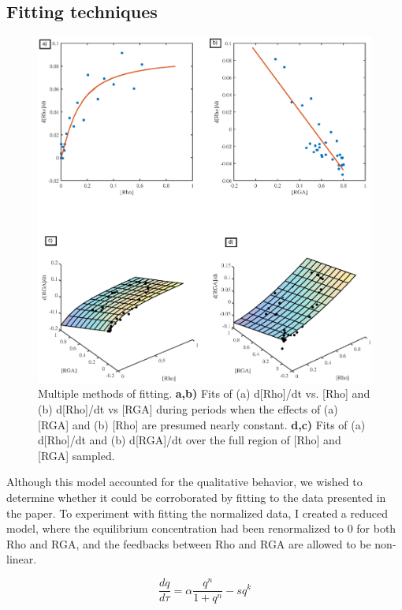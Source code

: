 \subsection{Fitting techniques}
\begin{figure}[h!]
	\centering
	\includegraphics[width=\hsize]{pulse/fitting_plot.eps}
	\caption[Multiple methods of fitting.]{\label{fig:pulse_fit}  Multiple methods of fitting. \textbf{a,b)} Fits of (a) d[Rho]/dt vs. [Rho]  and (b) d[Rho]/dt vs [RGA] during periods when the effects of (a) [RGA]  and (b) [Rho] are presumed nearly constant. \textbf{d,c)} Fits of (a) d[Rho]/dt and (b) d[RGA]/dt over the full region of [Rho] and [RGA] sampled.}
\end{figure}

Although this model accounted for the qualitative behavior, we wished to determine whether it could be corroborated by fitting to the data presented in the paper. To experiment with fitting the normalized data, I created a reduced model, where the equilibrium concentration had been renormalized to 0 for both Rho and RGA, and the feedbacks between Rho and RGA are allowed to be non-linear.  

\begin{equation}
	\frac{dq}{d\tau} =\alpha \frac{q^n}{1 +q^n} - s q^k
\end{equation}


